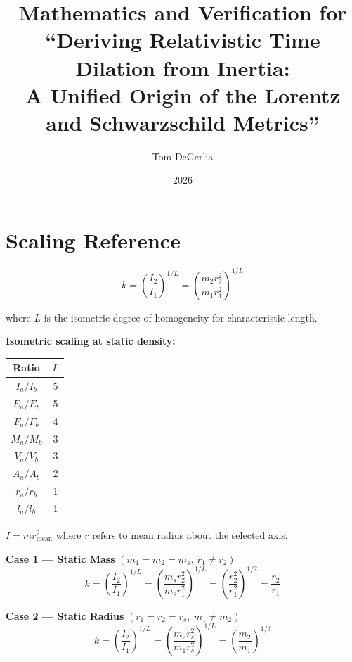\documentclass[12pt,a4paper]{article}
\title{Mathematics and Verification for\\
``Deriving Relativistic Time Dilation from Inertia:\\
A Unified Origin of the Lorentz and Schwarzschild Metrics''}
\author{Tom DeGerlia}
\date{2026}
\begin{document}
\maketitle

\section*{Scaling Reference}

\begin{equation}
k = \left(\frac{I_2}{I_1}\right)^{1/L} = \left(\frac{m_2 r_2^2}{m_1 r_1^2}\right)^{1/L}
\end{equation}

where $L$ is the isometric degree of homogeneity for characteristic length.

\medskip

\textbf{Isometric scaling at static density:}

\begin{center}
\begin{tabular}{cc}
\toprule
Ratio & $L$ \\
\midrule
$I_a/I_b$ & 5 \\
$E_a/E_b$ & 5 \\
$F_a/F_b$ & 4 \\
$M_a/M_b$ & 3 \\
$V_a/V_b$ & 3 \\
$A_a/A_b$ & 2 \\
$r_a/r_b$ & 1 \\
$l_a/l_b$ & 1 \\
\bottomrule
\end{tabular}
\end{center}

$I = mr_{\text{mean}}^2$ where $r$ refers to mean radius about the selected axis.

\medskip

\textbf{Case 1 --- Static Mass} $(m_1 = m_2 = m_s,\ r_1 \neq r_2)$
\begin{equation}
k = \left(\frac{I_2}{I_1}\right)^{1/L} = \left(\frac{m_s r_2^2}{m_s r_1^2}\right)^{1/L} = \left(\frac{r_2^2}{r_1^2}\right)^{1/2} = \frac{r_2}{r_1}
\end{equation}

\textbf{Case 2 --- Static Radius} $(r_1 = r_2 = r_s,\ m_1 \neq m_2)$
\begin{equation}
k = \left(\frac{I_2}{I_1}\right)^{1/L} = \left(\frac{m_2 r_s^2}{m_1 r_s^2}\right)^{1/L} = \left(\frac{m_2}{m_1}\right)^{1/3}
\end{equation}
\end{document}
